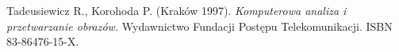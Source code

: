 \begin{thebibliography}{}

  Tadeusiewicz R., Korohoda P.
  (Kraków 1997).
  \emph{Komputerowa analiza i przetwarzanie obrazów.}
  Wydawnictwo Fundacji Postępu Telekomunikacji.
  ISBN 83-86476-15-X.
                
\end{thebibliography}
